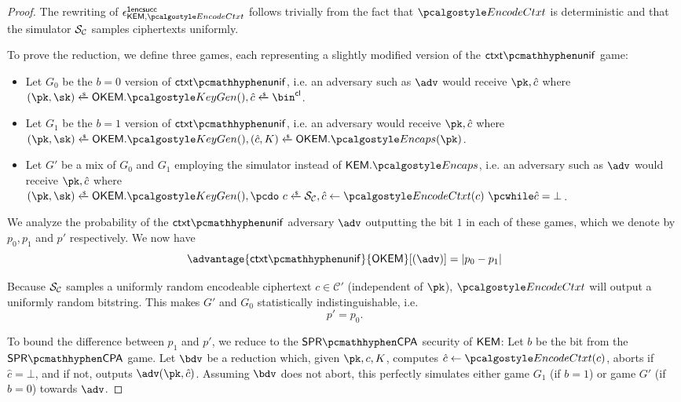 \begin{proof}
    The rewriting of $\epsilon^\firstencapssuccess_{\KEM,\encodectxt}$ follows trivially from the fact that $\encodectxt$ is deterministic and that the simulator $\mathcal{S}_\mathcal{C}$ samples ciphertexts uniformly.

    To prove the reduction, we define three games, each representing a slightly modified version of the $\ctxtunif$ game:
    \begin{itemize}
        \item Let $G_0$ be the $b=0$ version of $\ctxtunif$, i.e. an adversary such as $\adv$ would receive $\pk, \hat c$ where 
        $(\pk,\sk) \getsr \OKEM.\kgen(), \hat c \getsr \bin^\obfctxtlen$.
        \item Let $G_1$ be the $b=1$ version of $\ctxtunif$, i.e. an adversary would receive $\pk, \hat c$ where\\
        $(\pk,\sk) \getsr \OKEM.\kgen(), (\hat c, K) \getsr \OKEM.\encaps(\pk)$.
        \item Let $G'$ be a mix of $G_0$ and $G_1$ employing the simulator instead of $\KEM.\encaps$, i.e. an adversary such as $\adv$ would receive $\pk, \hat c$ where\\
        $(\pk,\sk) \getsr \OKEM.\kgen(), \pcdo\ c \getsr \simulunif, \hat c \gets \encodectxt(c)\ \pcwhile \hat c = \bot$.
    \end{itemize}

    We analyze the probability of the $\ctxtunif$ adversary $\adv$ outputting the bit $1$ in each of these games, which we denote by $p_0, p_1$ and $p'$ respectively.
    We now have
    \[
        \advantage{\ctxtunif}{\OKEM}[(\adv)] = \left| p_0 - p_1 \right|
    \]

    Because $\mathcal{S}_\mathcal{C}$ samples a uniformly random encodeable ciphertext $c \in \mathcal{C}'$ (independent of $\pk$), $\encodectxt$ will output a uniformly random bitstring. This makes $G'$ and $G_0$ statistically indistinguishable, i.e.
    \[ p' = p_0. \]

    To bound the difference between $p_1$ and $p'$, we reduce to the $\sprcpa$ security of $\mathsf{KEM}$:
    Let $b$ be the bit from the $\sprcpa$ game. Let $\bdv$ be a reduction which, given $\pk, c, K$, computes $\hat c \gets \encodectxt(c)$, aborts if $\hat c = \bot$, and if not, outputs $\adv(\pk, \hat c)$.
    Assuming $\bdv$ does not abort, this perfectly simulates either game $G_1$ (if $b=1$) or game $G'$ (if $b=0$) towards $\adv$.
    

\end{proof}
